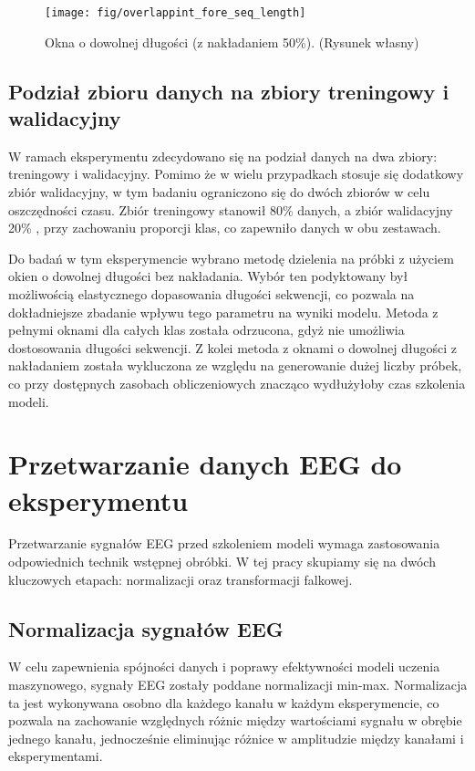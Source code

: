 \documentclass[eeg_v4.tex]{subfiles}
\begin{document}
    \begin{figure}[h!]
        \centering
        \texttt{[image: fig/overlappint\_fore\_seq\_length]}
        \caption{Okna o dowolnej długości (z nakładaniem 50\%). (Rysunek własny)}
        \label{fig:overlapping}
    \end{figure}

    \subsection{Podział zbioru danych na zbiory treningowy i walidacyjny}
    W ramach eksperymentu zdecydowano się na podział danych na dwa zbiory: treningowy i walidacyjny. Pomimo że w wielu
    przypadkach stosuje się dodatkowy zbiór walidacyjny, w tym badaniu ograniczono się do dwóch zbiorów w celu
    oszczędności czasu. Zbiór treningowy stanowił 80\% danych, a zbiór walidacyjny 20\%
    , przy zachowaniu proporcji klas, co zapewniło danych w obu zestawach.

    Do badań w tym eksperymencie wybrano metodę dzielenia na próbki z użyciem okien o dowolnej długości bez nakładania.
    Wybór ten podyktowany był możliwością elastycznego dopasowania długości sekwencji, co pozwala na dokładniejsze
    zbadanie wpływu tego parametru na wyniki modelu. Metoda z pełnymi oknami dla całych klas została odrzucona, gdyż nie
    umożliwia dostosowania długości sekwencji. Z kolei metoda z oknami o dowolnej
    długości z nakładaniem została wykluczona ze względu na generowanie dużej liczby próbek, co przy dostępnych zasobach
    obliczeniowych znacząco wydłużyłoby czas szkolenia modeli.


    \section{Przetwarzanie danych EEG do eksperymentu}

    Przetwarzanie sygnałów EEG przed szkoleniem modeli wymaga zastosowania odpowiednich technik wstępnej obróbki. W tej
    pracy skupiamy się na dwóch kluczowych etapach: normalizacji oraz transformacji falkowej.

    \subsection{Normalizacja sygnałów EEG}

    W celu zapewnienia spójności danych i poprawy efektywności modeli uczenia maszynowego, sygnały EEG zostały poddane
    normalizacji min-max. Normalizacja ta jest wykonywana osobno dla każdego kanału w każdym eksperymencie, co pozwala
    na zachowanie względnych różnic między wartościami sygnału w obrębie jednego kanału, jednocześnie eliminując różnice
    w amplitudzie między kanałami i eksperymentami.
\end{document}
